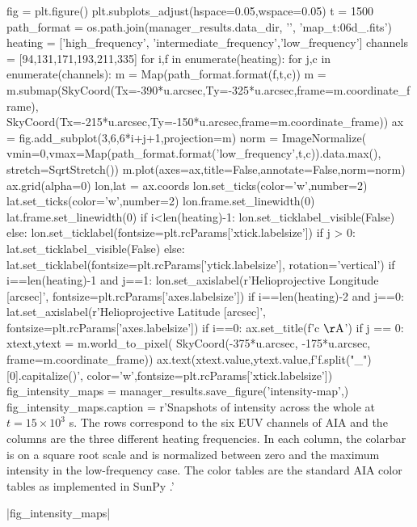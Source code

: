 \begin{pycode}
fig = plt.figure()
plt.subplots_adjust(hspace=0.05,wspace=0.05)
t = 1500
path_format = os.path.join(manager_results.data_dir, '{}', 'map_t{:06d}_{}.fits')
heating = ['high_frequency', 'intermediate_frequency','low_frequency']
channels = [94,131,171,193,211,335]
for i,f in enumerate(heating):
    for j,c in enumerate(channels):
        m = Map(path_format.format(f,t,c))
        m = m.submap(SkyCoord(Tx=-390*u.arcsec,Ty=-325*u.arcsec,frame=m.coordinate_frame),
                     SkyCoord(Tx=-215*u.arcsec,Ty=-150*u.arcsec,frame=m.coordinate_frame))
        ax = fig.add_subplot(3,6,6*i+j+1,projection=m)
        norm = ImageNormalize(
            vmin=0,vmax=Map(path_format.format('low_frequency',t,c)).data.max(),
            stretch=SqrtStretch())
        m.plot(axes=ax,title=False,annotate=False,norm=norm)
        ax.grid(alpha=0)
        lon,lat = ax.coords
        lon.set_ticks(color='w',number=2)
        lat.set_ticks(color='w',number=2)
        lon.frame.set_linewidth(0)
        lat.frame.set_linewidth(0)
        if i<len(heating)-1:
            lon.set_ticklabel_visible(False)
        else:
            lon.set_ticklabel(fontsize=plt.rcParams['xtick.labelsize'])
        if j > 0:
            lat.set_ticklabel_visible(False)
        else:
            lat.set_ticklabel(fontsize=plt.rcParams['ytick.labelsize'], rotation='vertical')
        if i==len(heating)-1 and j==1:
            lon.set_axislabel(r'Helioprojective Longitude [arcsec]',
                                fontsize=plt.rcParams['axes.labelsize'])
        if i==len(heating)-2 and j==0:
            lat.set_axislabel(r'Helioprojective Latitude [arcsec]',
                                fontsize=plt.rcParams['axes.labelsize'])
        if i==0:
            ax.set_title(f'{c} $\mathrm{{\AA}}$')
        if j == 0:
            xtext,ytext = m.world_to_pixel(
                SkyCoord(-375*u.arcsec, -175*u.arcsec, frame=m.coordinate_frame))
            ax.text(xtext.value,ytext.value,f'{f.split("_")[0].capitalize()}',
                    color='w',fontsize=plt.rcParams['xtick.labelsize'])
fig_intensity_maps = manager_results.save_figure('intensity-map',)
fig_intensity_maps.caption = r'Snapshots of intensity across the whole \AR{} at $t=15\times10^3$ s. The rows correspond to the six EUV channels of AIA and the columns are the three different heating frequencies. In each column, the colarbar is on a square root scale and is normalized between zero and the maximum intensity in the low-frequency case. The color tables are the standard AIA color tables as implemented in SunPy \citep{sunpy_community_sunpypython_2015}.'
\end{pycode}
|fig_intensity_maps|

